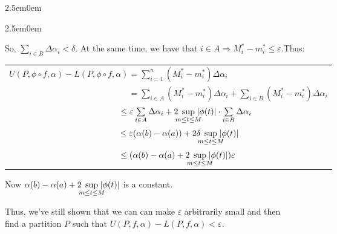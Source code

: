 \documentclass{book}
\newenvironment{myIndent}{%
   \begin{adjustwidth}{2.5em}{0em}%
}{%
   \end{adjustwidth}%
}
\newcommand{\retTwo}{\hfill\bigbreak}
\begin{document}
{\begin{myIndent}
{\begin{myIndent}
      So, $\sum\limits_{i \in B}\Delta \alpha_i < \delta$. At the same time, we have that $i \in A \Longrightarrow M_i^* - m_i^* \leq \varepsilon$.\retTwo Thus:\\ [-30pt]
      \begin{center}
         \begin{tabular}{l}
            $U(P, \phi \circ f, \alpha) - L(P, \phi \circ f, \alpha) = \sum\limits_{i=1}^n(M_i^* - m_i^*)\Delta \alpha_i$\\ [16pt]

            $\phantom{U(P, \phi \circ f, \alpha) - L(P, \phi \circ f, \alpha)} = \sum\limits_{i\in A}(M_i^* - m_i^*)\Delta \alpha_i + \sum\limits_{i\in B}(M_i^* - m_i^*)\Delta \alpha_i$\\ [14pt]

            $\phantom{U(P, \phi \circ f, \alpha) - L(P, \phi \circ f, \alpha)} \leq \varepsilon \sum\limits_{i\in A}\Delta \alpha_i  + 2\hspace{-0.5em}\sup\limits_{m\leq t\leq M}\hspace{-0.7em}|\phi(t)| \cdot \sum\limits_{i\in B} \Delta \alpha_i$\\ [14pt]

            $\phantom{U(P, \phi \circ f, \alpha) - L(P, \phi \circ f, \alpha)} \leq \varepsilon (\alpha(b) - \alpha(a))  + 2\delta \hspace{-0.5em}\sup\limits_{m\leq t\leq M}\hspace{-0.7em}|\phi(t)|$\\ [14pt]

            $\phantom{U(P, \phi \circ f, \alpha) - L(P, \phi \circ f, \alpha)} \leq (\alpha(b) - \alpha(a) + 2\hspace{-0.5em}\sup\limits_{m\leq t\leq M}\hspace{-0.7em}|\phi(t)|)\varepsilon$
         \end{tabular}
      \end{center}

      \newpage

      Now $\alpha(b) - \alpha(a) + 2\hspace{-0.5em}\sup\limits_{m\leq t\leq M}\hspace{-0.7em}|\phi(t)|$ is a constant.\retTwo
      
      Thus, we've still shown that we can can make $\varepsilon$ arbitrarily small and then\\ find a partition $P$ such that $U(P, f, \alpha) - L(P, f, \alpha) < \varepsilon$.\retTwo
   \end{myIndent}}
\end{myIndent}}
\end{document}
